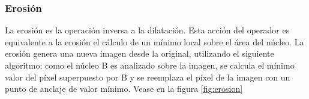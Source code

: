 \subsubsection{Erosión}
La erosión es la operación inversa a la dilatación. Esta acción del operador es equivalente a la erosión el cálculo de un mínimo local sobre el área del núcleo. La erosión genera una nueva imagen desde la original, utilizando el siguiente algoritmo: como el
núcleo B es analizado sobre la imagen, se calcula el mínimo valor del píxel superpuesto por B y se reemplaza el píxel de la imagen con un punto de anclaje de valor mínimo. \cite{BookOpenCv}
Vease en la figura \ref{fig:erosion}

